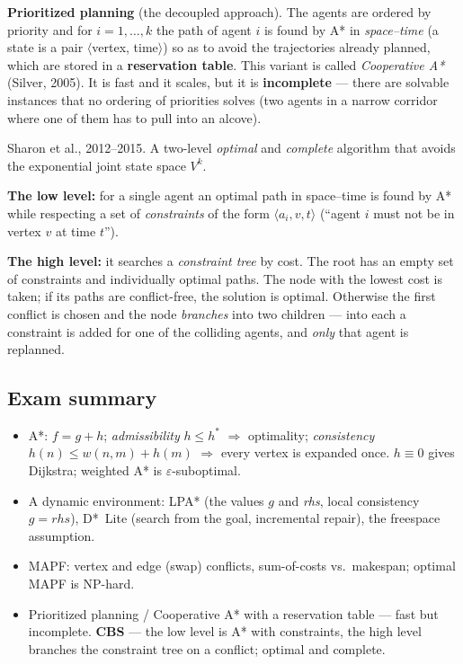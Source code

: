 \documentclass[11pt,a4paper]{article}
\theoremstyle{definition}
\providecommand{\uv}[1]{``#1''}
\begin{document}
\textbf{Prioritized planning} (the decoupled approach). The agents are ordered by priority and
for $i = 1,\dots,k$ the path of agent $i$ is found by A* in \emph{space--time} (a state is a
pair $\langle$vertex, time$\rangle$) so as to avoid the trajectories already planned, which are
stored in a \textbf{reservation table}. This variant is called \emph{Cooperative A*}
(Silver, 2005). It is fast and it scales, but it is \textbf{incomplete} --- there are solvable
instances that no ordering of priorities solves (two agents in a narrow corridor where one of
them has to pull into an alcove).

\begin{defbox}
Sharon et al., 2012--2015. A two-level \emph{optimal} and \emph{complete} algorithm that avoids
the exponential joint state space $V^k$.

\textbf{The low level:} for a single agent an optimal path in space--time is found by A* while
respecting a set of \emph{constraints} of the form $\langle a_i, v, t\rangle$
(\uv{agent $i$ must not be in vertex $v$ at time $t$}).

\textbf{The high level:} it searches a \emph{constraint tree} by cost. The root has an empty set
of constraints and individually optimal paths. The node with the lowest cost is taken; if its
paths are conflict-free, the solution is optimal. Otherwise the first conflict is chosen and the
node \emph{branches} into two children --- into each a constraint is added for one of the
colliding agents, and \emph{only} that agent is replanned.
\end{defbox}

\subsection{Exam summary}

\begin{itemize}
\item A*: $f = g+h$; \emph{admissibility} $h \le h^*$ $\Rightarrow$ optimality;
  \emph{consistency} $h(n) \le w(n,m)+h(m)$ $\Rightarrow$ every vertex is expanded once.
  $h\equiv 0$ gives Dijkstra; weighted A* is $\varepsilon$-suboptimal.
\item A dynamic environment: LPA* (the values $g$ and \emph{rhs}, local consistency
  $g=\mathit{rhs}$), D*~Lite (search from the goal, incremental repair), the freespace
  assumption.
\item MAPF: vertex and edge (swap) conflicts, sum-of-costs vs.\ makespan; optimal MAPF is
  NP-hard.
\item Prioritized planning / Cooperative A* with a reservation table --- fast but incomplete.
  \textbf{CBS} --- the low level is A* with constraints, the high level branches the constraint
  tree on a conflict; optimal and complete.
\end{itemize}
\end{document}
